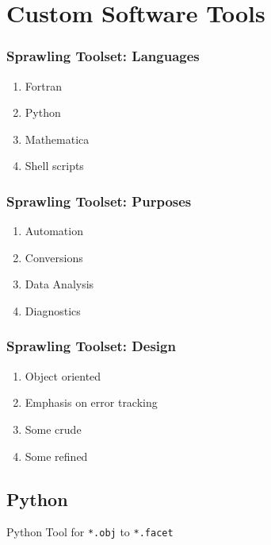 % 

\section{Custom Software Tools}
\begin{frame}\frametitle{Sprawling Toolset: Languages}
\begin{enumerate}
	\item Fortran
	\item Python
	\item Mathematica
	\item Shell scripts
\end{enumerate}
\end{frame}

\begin{frame}\frametitle{Sprawling Toolset: Purposes}
\begin{enumerate}
	\item Automation
	\item Conversions
	\item Data Analysis
	\item Diagnostics
\end{enumerate}
\end{frame}

\begin{frame}\frametitle{Sprawling Toolset: Design}
\begin{enumerate}
	\item Object oriented
	\item Emphasis on error tracking
	\item Some crude
	\item Some refined
\end{enumerate}
\end{frame}


\subsection{Python}
\renewcommand{\listingFontSize}{\tiny} 
\begin{frame}{Python Tool for \texttt{*.obj} to \texttt{*.facet}}
    \lstset{style=python} %
    
\end{frame}

